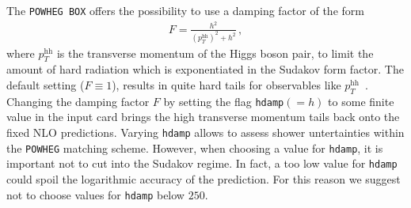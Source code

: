 \documentclass[paper]{JHEP3}
\newcommand\POWHEG{{\tt POWHEG}}
\newcommand\POWHEGBOX{{\tt POWHEG BOX}}
\newcommand\pthh{\ensuremath{p_{T}^{\mathrm{hh}}}\xspace}
\begin{document}
The \POWHEGBOX{} offers the possibility to use a damping factor of the
form~\cite{Alioli:2008tz,Alioli:2009je}
\begin{align}
  F=\frac{h^{2}}{(\pthh)^2+h^{2}}\,,
\end{align}
where \pthh is the transverse momentum of the Higgs boson pair, to
limit the amount of hard radiation which is exponentiated in the
Sudakov form factor. The default setting ($F\equiv1$), results in
quite hard tails for observables like
$\pthh$~\cite{Heinrich:2017kxx}. Changing the damping factor $F$ by
setting the flag {\tt hdamp}$(=h)$ to some finite value in the input
card brings the high transverse momentum tails back onto the fixed NLO
predictions. Varying {\tt hdamp} allows to assess shower untertainties
within the \POWHEG{} matching scheme. However, when choosing a value
for {\tt hdamp}, it is important not to cut into the Sudakov
regime. In fact, a too low value for {\tt hdamp} could spoil the
logarithmic accuracy of the prediction. For this reason we suggest not
to choose values for {\tt hdamp} below $250$.
\end{document}
